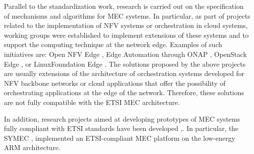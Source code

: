 
Parallel to the standardization work, research is carried out on the specification of mechanisms and algorithms for MEC systems. In particular, as part of projects related to the implementation of NFV systems or orchestration in cloud systems, working groups were established to implement extensions of these systems and to support the computing technique at the network edge. Examples of such initiatives are: Open NFV Edge \cite{opennfv-edge}, Edge Automation through ONAP \cite{onap-project}, OpenStack Edge \cite{openstack-project}, or LinuxFoundation Edge \cite{lfedge-project}. The solutions proposed by the above projects are usually extensions of the architecture of orchestration systems developed for NFV backbone networks or cloud applications that offer the possibility of orchestrating applications at the edge of the network. Therefore, these solutions are not fully compatible with the ETSI MEC architecture. 

In addition, research projects aimed at developing prototypes of MEC systems fully compliant with ETSI standards have been developed \cite{5gcity-project},\cite{openness-project}. In particular, the SYMEC \cite{symec-project}, implemented an ETSI-compliant MEC platform on the low-energy ARM architecture. 

